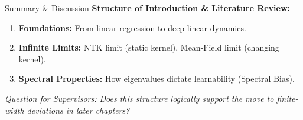 \documentclass[10pt,aspectratio=169]{beamer}
\begin{document}
\begin{frame}{Summary \& Discussion}
	\textbf{Structure of Introduction \& Literature Review:}
	\begin{enumerate}
		\item \textbf{Foundations:} From linear regression to deep linear dynamics.
		\item \textbf{Infinite Limits:} NTK limit (static kernel), Mean-Field limit (changing kernel).
		\item \textbf{Spectral Properties:} How eigenvalues dictate learnability (Spectral Bias).
	\end{enumerate}

	\vspace{0.5cm}
	\textit{Question for Supervisors: Does this structure logically support the move to finite-width deviations in later chapters?}
\end{frame}

\end{document}
